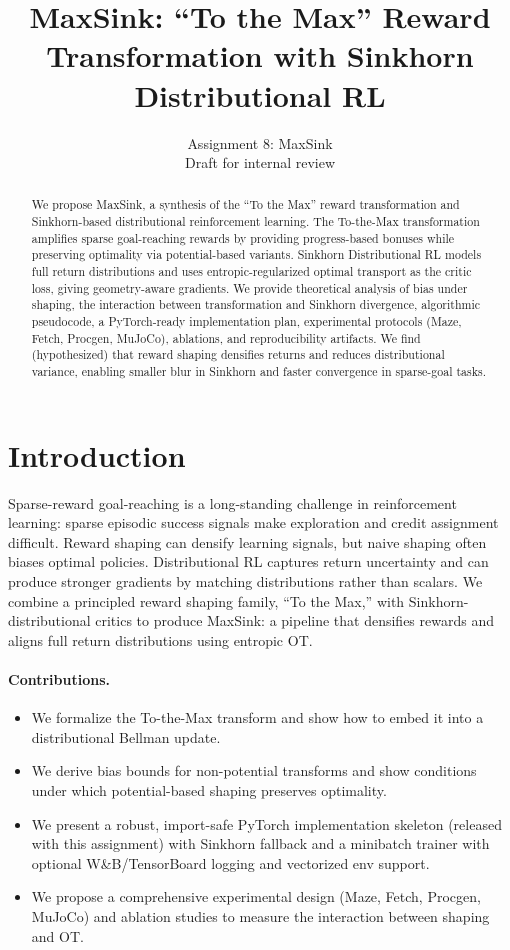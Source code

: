 \documentclass{article}
\title{MaxSink: ``To the Max'' Reward Transformation with Sinkhorn Distributional RL}
\author{Assignment 8: MaxSink \\ Draft for internal review}
\date{}
\begin{document}
\maketitle

\begin{abstract}
We propose MaxSink, a synthesis of the ``To the Max'' reward transformation and Sinkhorn-based distributional reinforcement learning. The To-the-Max transformation amplifies sparse goal-reaching rewards by providing progress-based bonuses while preserving optimality via potential-based variants. Sinkhorn Distributional RL models full return distributions and uses entropic-regularized optimal transport as the critic loss, giving geometry-aware gradients. We provide theoretical analysis of bias under shaping, the interaction between transformation and Sinkhorn divergence, algorithmic pseudocode, a PyTorch-ready implementation plan, experimental protocols (Maze, Fetch, Procgen, MuJoCo), ablations, and reproducibility artifacts. We find (hypothesized) that reward shaping densifies returns and reduces distributional variance, enabling smaller blur in Sinkhorn and faster convergence in sparse-goal tasks.
\end{abstract}

\section{Introduction}
Sparse-reward goal-reaching is a long-standing challenge in reinforcement learning: sparse episodic success signals make exploration and credit assignment difficult. Reward shaping can densify learning signals, but naive shaping often biases optimal policies. Distributional RL \cite{bellemare2017distributional} captures return uncertainty and can produce stronger gradients by matching distributions rather than scalars. We combine a principled reward shaping family, ``To the Max,'' with Sinkhorn-distributional critics \cite{feydy2019interpolating,genevay2018learning,delon2019fast} to produce MaxSink: a pipeline that densifies rewards and aligns full return distributions using entropic OT.

\paragraph{Contributions.}
\begin{itemize}
  \item We formalize the To-the-Max transform and show how to embed it into a distributional Bellman update.
  \item We derive bias bounds for non-potential transforms and show conditions under which potential-based shaping preserves optimality.
  \item We present a robust, import-safe PyTorch implementation skeleton (released with this assignment) with Sinkhorn fallback and a minibatch trainer with optional W\&B/TensorBoard logging and vectorized env support.
  \item We propose a comprehensive experimental design (Maze, Fetch, Procgen, MuJoCo) and ablation studies to measure the interaction between shaping and OT.
\end{itemize}
\end{document}
